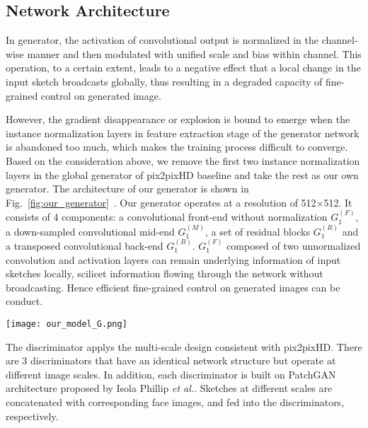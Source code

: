 \documentclass[10pt,twocolumn,letterpaper]{article}
\begin{document}
\subsection{Network Architecture}
In generator, the activation of convolutional output is normalized in the channel-wise manner and then modulated with unified scale and bias within channel. This operation, to a certain extent, leads to a negative effect that a local change in the input sketch broadcasts globally, thus resulting in a degraded capacity of fine-grained control on generated image.
 
However, the gradient disappearance or explosion is bound to emerge when the instance normalization layers in feature extraction stage of the generator network is abandoned too much, which makes the training process difficult to converge. Based on the consideration above, we remove the first two instance normalization layers in the global generator of pix2pixHD baseline and take the rest as our own generator. The architecture of our generator is shown in Fig.~\ref{fig:our_generator}~. Our generator operates at a resolution of 512×512. It consists of 4 components: a convolutional front-end without normalization $G_1^{(F)}$, a down-sampled convolutional mid-end $G_1^{(M)}$, a set of residual blocks $G_1^{(R)}$ and a transposed convolutional back-end $G_1^{(B)}$. $G_1^{(F)}$ composed of two unnormalized convolution and activation layers can remain underlying information of input sketches locally, scilicet information flowing through the network without broadcasting. Hence efficient fine-grained control on generated images can be conduct. %
\begin{figure*}[htbp]
	\centering
	\texttt{[image: our\_model\_G.png]}
	\caption{Network architecture of our generator. }
	\label{fig:our_generator}
\end{figure*}

The discriminator applys the multi-scale design consistent with pix2pixHD. There are 3 discriminators that have an identical network structure but operate at different image scales. In addition, each discriminator is built on PatchGAN architecture proposed by Isola Phillip \textit{et al.}\cite{pix2pix}. Sketches at different scales are concatenated with corresponding face images, and fed into the discriminators, respectively. 
\end{document}
